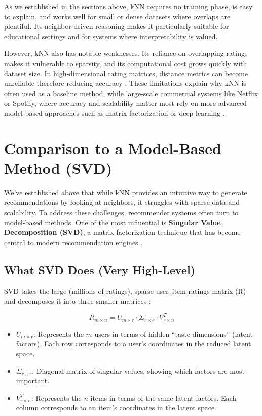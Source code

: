 \documentclass[
  12pt]{article}
\providecommand{\tightlist}{%
  \setlength{\itemsep}{0pt}\setlength{\parskip}{0pt}}
\begin{document}
As we established in the sections above, kNN requires no training phase,
is easy to explain, and works well for small or dense datasets where
overlaps are plentiful. Its neighbor‑driven reasoning makes it
particularly suitable for educational settings and for systems where
interpretability is valued.

However, kNN also has notable weaknesses. Its reliance on overlapping
ratings makes it vulnerable to sparsity, and its computational cost
grows quickly with dataset size. In high‑dimensional rating matrices,
distance metrics can become unreliable therefore reducing accuracy
\citep{kramer2013}. These limitations explain why kNN is often used as a
baseline method, while large‑scale commercial systems like Netflix or
Spotify, where accuracy and scalability matter most rely on more
advanced model‑based approaches such as matrix factorization or deep
learning \citep{hssina2021}.

\section{\texorpdfstring{\textbf{Comparison to a Model-Based Method
(SVD)}}{Comparison to a Model-Based Method (SVD)}}\label{comparison-to-a-model-based-method-svd}

We've established above that while kNN provides an intuitive way to
generate recommendations by looking at neighbors, it struggles with
sparse data and scalability. To address these challenges, recommender
systems often turn to model-based methods. One of the most influential
is \textbf{Singular Value Decomposition (SVD)}, a matrix factorization
technique that has become central to modern recommendation engines
\citep{hssina2021}.

\subsection{What SVD Does (Very
High-Level)}\label{what-svd-does-very-high-level}

SVD takes the large (millions of ratings), sparse user--item ratings
matrix (R) and decomposes it into three smaller matrices
\citep{apxml2025, hssina2021}:

\[
R_{m \times n} = U_{m \times r} \cdot \Sigma_{r \times r} \cdot V^T_{r \times n}
\]

\begin{itemize}
\tightlist
\item
  \(U_{m \times r}\): Represents the \(m\) users in terms of hidden
  ``taste dimensions'' (latent factors). Each row corresponds to a
  user's coordinates in the reduced latent space.
\item
  \(\Sigma_{r \times r}\): Diagonal matrix of singular values, showing
  which factors are most important.
\item
  \(V^T_{r \times n}\): Represents the \(n\) items in terms of the same
  latent factors. Each column corresponds to an item's coordinates in
  the latent space.
\end{itemize}
\end{document}
